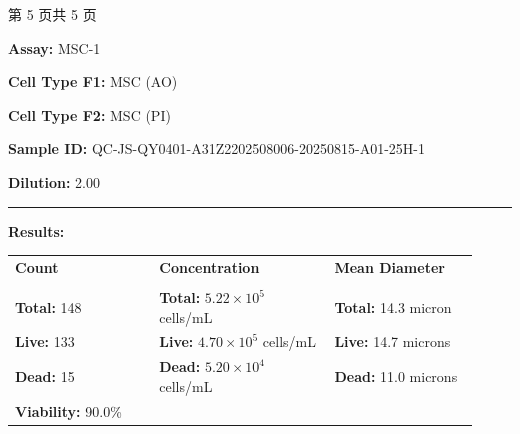 \documentclass[UTF8,10pt,a4paper,fontset=fandol]{ctexart}
\newcommand{\fieldvalue}[1]{#1}
\begin{document}
\vfill
\begin{center}
\scriptsize 第 5 页\quad 共 5 页
\end{center}

\newpage

\noindent
\textbf{Assay:}
\fieldvalue{MSC-1}

\medskip
\noindent
\textbf{Cell Type F1:}
\fieldvalue{MSC (AO)}

\noindent
\textbf{Cell Type F2:}
\fieldvalue{MSC (PI)}

\medskip
\noindent
\textbf{Sample ID:}
\fieldvalue{QC-JS-QY0401-A31Z2202508006-20250815-A01-25H-1}

\noindent
\textbf{Dilution:}
\fieldvalue{2.00}

\bigskip
\noindent\rule{\linewidth}{0.4pt}

\noindent\textbf{Results:}

\medskip
\noindent
\begin{tabular}{@{}p{0.29\linewidth}p{0.34\linewidth}p{0.29\linewidth}@{}}
\textbf{Count} & \textbf{Concentration} & \textbf{Mean Diameter} \\
\underline{\hspace{0.24\linewidth}} &
\underline{\hspace{0.29\linewidth}} &
\underline{\hspace{0.24\linewidth}} \\[2pt]

\textbf{Total:}
\fieldvalue{148}
&
\textbf{Total:}
\fieldvalue{$5.22\times10^{5}$ cells/mL}
&
\textbf{Total:}
\fieldvalue{14.3 micron}
\\

\textbf{Live:}
\fieldvalue{133}
&
\textbf{Live:}
\fieldvalue{$4.70\times10^{5}$ cells/mL}
&
\textbf{Live:}
\fieldvalue{14.7 microns}
\\

\textbf{Dead:}
\fieldvalue{15}
&
\textbf{Dead:}
\fieldvalue{$5.20\times10^{4}$ cells/mL}
&
\textbf{Dead:}
\fieldvalue{11.0 microns}
\\

\textbf{Viability:}
\fieldvalue{90.0\%}
&
&
\end{tabular}
\end{document}
